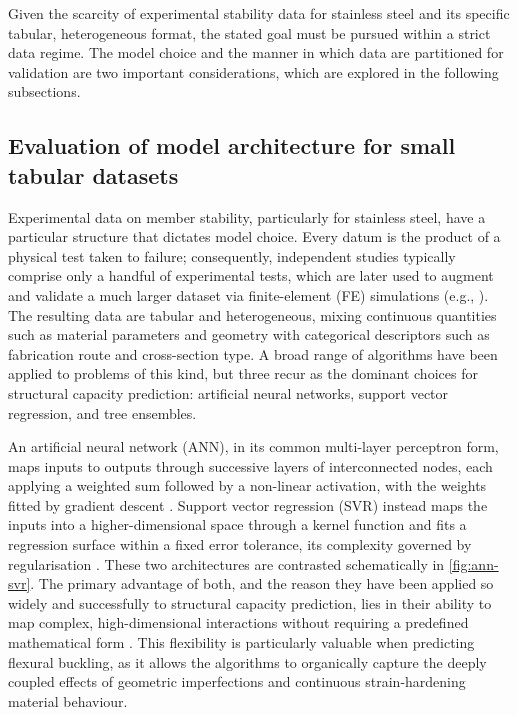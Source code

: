 Given the scarcity of experimental stability data for stainless steel and its specific tabular, heterogeneous format, the stated goal must be pursued within a strict data regime. The model choice and the manner in which data are partitioned for validation are two important considerations, which are explored in the following subsections.

\subsection{Evaluation of model architecture for small tabular datasets}
\label{sec:ml-architectures}

Experimental data on member stability, particularly for stainless steel, have a particular structure that dictates model choice. Every datum is the product of a physical test taken to failure; consequently, independent studies typically comprise only a handful of experimental tests, which are later used to augment and validate a much larger dataset via finite-element (FE) simulations (e.g., \parencite{buchanan2018,yuan2015,sun2020}). The resulting data are tabular and heterogeneous, mixing continuous quantities such as material parameters and geometry with categorical descriptors such as fabrication route and cross-section type. A broad range of algorithms have been applied to problems of this kind, but three recur as the dominant choices for structural capacity prediction: artificial neural networks, support vector regression, and tree ensembles.

An artificial neural network (ANN), in its common multi-layer perceptron form, maps inputs to outputs through successive layers of interconnected nodes, each applying a weighted sum followed by a non-linear activation, with the weights fitted by gradient descent \parencite{goodfellow2016}. Support vector regression (SVR) instead maps the inputs into a higher-dimensional space through a kernel function and fits a regression surface within a fixed error tolerance, its complexity governed by regularisation \parencite{smola2004}. These two architectures are contrasted schematically in \cref{fig:ann-svr}. The primary advantage of both, and the reason they have been applied so widely and successfully to structural capacity prediction, lies in their ability to map complex, high-dimensional interactions without requiring a predefined mathematical form \parencite{thai2022}. This flexibility is particularly valuable when predicting flexural buckling, as it allows the algorithms to organically capture the deeply coupled effects of geometric imperfections and continuous strain-hardening material behaviour.

